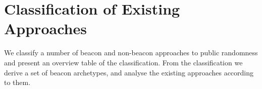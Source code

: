 \section{Classification of Existing Approaches}\label{sec:classification}

We classify a number of beacon and non-beacon approaches to public randomness and present an overview table of the classification.
From the classification we derive a set of beacon archetypes, and analyse the existing approaches according to them.
